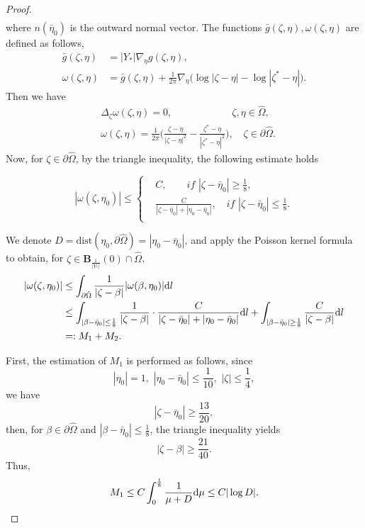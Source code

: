 \documentclass[11pt,reqno]{amsart}%
\theoremstyle{definition}
\theoremstyle{remark}
\begin{document}
\begin{proof}
\begin{align}
\end{align}
where $n(\bar{\eta}_{0})$ is the outward normal vector. The functions $\bar{g}(\zeta,\eta),\omega(\zeta,\eta)$ are defined as follows,
\begin{align}
\bar{g}(\zeta,\eta)&=|Y_{*}|\nabla_{\eta}g(\zeta,\eta),\nonumber\\
\omega(\zeta,\eta)&=\bar{g}(\zeta,\eta)+\frac{1}{2\pi}\nabla_{\eta}\big(\log|\zeta-\eta|-\log|\zeta^{*}-\eta|\big).\nonumber
\end{align}
Then we have
\begin{align}
&\Delta_{\zeta}\omega(\zeta,\eta)=0, \qquad \qquad\qquad \zeta,\eta\in\hat{\Omega},\nonumber\\
&\omega(\zeta,\eta)=\frac{1}{2\pi}\big(\frac{\zeta-\eta}{|\zeta-\eta|^{2}}-\frac{\zeta^{*}-\eta}{|\zeta^{*}-\eta|^{2}}\big),\quad \zeta\in\partial\hat{\Omega}.\nonumber
\end{align}
Now, for $\zeta\in\partial\hat{\Omega}$, by the triangle inequality, the following estimate holds

\begin{equation}\nonumber
|\omega(\zeta,\eta_{0})|\leq\left\{\begin{aligned}
 &C, \qquad  if\,\, |\zeta-\bar{\eta}_{0}|\geq \frac{1}{8}, \\
&\frac{C}{|\zeta-\bar{\eta}_{0}|+|\eta_{0}-\bar{\eta}_{0}|}, \quad  if\,\, |\zeta-\bar{\eta}_{0}|\leq \frac{1}{8}.\\
\end{aligned}  \right.
\end{equation}

We denote $D=\text{dist}(\eta_{0},\partial\hat{\Omega})=|\eta_{0}-\bar{\eta}_{0}|$, and apply the Poisson kernel formula to obtain, for $\zeta\in \mathbf{B}_{\frac{1}{|Y_{*}|}}(0)\cap\hat{\Omega}$,
\begin{align}
|\omega(\zeta,\eta_{0})|&\leq\int_{\partial\hat{\Omega}}\frac{1}{|\zeta-\beta|}|\omega(\beta,\eta_{0})|{\rm d}l\nonumber\\
&\leq\int_{|\beta-\bar{\eta}_{0}|\leq\frac{1}{8}}\frac{1}{|\zeta-\beta|}\cdot\frac{C}{|\zeta-\bar{\eta}_{0}|+|\eta_{0}-\bar{\eta}_{0}|}{\rm d}l+
\int_{|\beta-\bar{\eta}_{0}|\geq\frac{1}{8}}\frac{C}{|\zeta-\beta|}{\rm d}l\nonumber\\
&=:M_{1}+M_{2}\nonumber.
\end{align}

First, the estimation of $M_{1}$ is performed  as follows, since
$$|\eta_{0}|=1,\,\, |\eta_{0}-\bar{\eta}_{0}|\leq\frac{1}{10},\,\, |\zeta|\leq \frac{1}{4},$$
we have
$$|\zeta-\bar{\eta}_{0}|\geq\frac{13}{20},$$
then, for $\beta\in \partial\hat{\Omega}$ and $|\beta-\bar{\eta}_{0}|\leq\frac{1}{8}$, the triangle inequality yields
$$|\zeta-\beta|\geq\frac{21}{40}.$$
Thus,
\begin{align}
M_{1}\leq C\int_{0}^{\frac{1}{8}}\frac{1}{\mu+D}{\rm d}\mu\leq C|\log D|.\nonumber
\end{align}


\end{proof}
\end{document}
